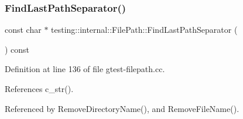 \subsubsection{\texorpdfstring{Find\+Last\+Path\+Separator()}{FindLastPathSeparator()}}
{\footnotesize\ttfamily const char $\ast$ testing\+::internal\+::\+File\+Path\+::\+Find\+Last\+Path\+Separator (\begin{DoxyParamCaption}{ }\end{DoxyParamCaption}) const\hspace{0.3cm}{\ttfamily [private]}}



Definition at line 136 of file gtest-\/filepath.\+cc.



References c\+\_\+str().



Referenced by Remove\+Directory\+Name(), and Remove\+File\+Name().


